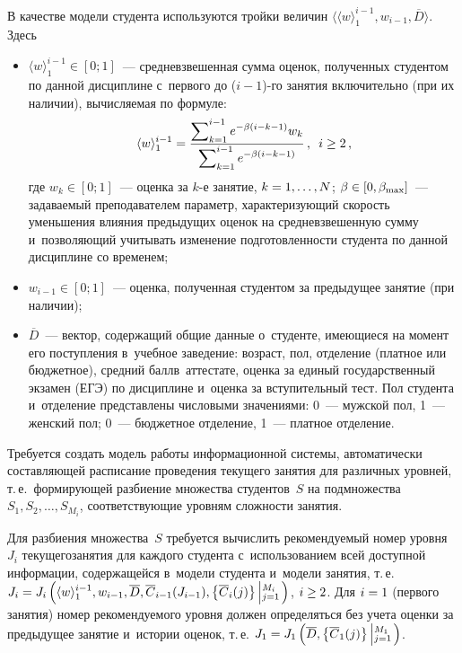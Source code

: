 \begin{multicols}{2}
  В качестве модели студента используются тройки величин $\langle\langle 
w\rangle_1^{i-1}, w_{i-1}, \overline{D}\rangle$. Здесь
  \begin{itemize}
\item $\langle w\rangle_1^{i-1}\in [0;1]$~--- средневзвешенная сумма оценок, 
полученных студентом по данной дис\-циплине с~первого до ($i-1$)-го занятия 
включитель\-но (при их наличии), вычисляемая по формуле:
\begin{equation}
\langle w\rangle_1^{i-1}= \displaystyle\frac{\displaystyle \sum\nolimits_{k=1}^{i-1}  
e^{-\beta(i-k-1)}w_k\mathstrut}{\displaystyle \sum\nolimits_{k=1}^{i-1} e^{-\beta(i-k-1)}\mathstrut}\,, 
\enskip i\geq 2\,,
\label{e1-al}
\end{equation}
  где $w_k\in [0;1]$~--- оценка за $k$-е занятие, $k\hm=1,\ldots, N$; 
$\beta\hm\in [0,\beta_{\max}]$~--- задаваемый преподавателем параметр, 
характеризующий скорость уменьшения влияния предыдущих оценок на 
средневзвешенную сумму и~позволяющий учитывать изменение 
подготовленности студента по данной дисциплине со временем; 
\item $w_{i-1}\in [0;1]$~--- оценка, полученная студентом за предыдущее 
занятие (при наличии); 
\item $\overline{D}$~--- вектор, содержащий общие данные о~студенте, 
имеющиеся на момент его поступления в~учебное заведение: возраст, пол, 
отделение (платное или бюджетное), средний балл\linebreak в~аттестате, оценка за единый
государственный экзамен (ЕГЭ) 
по дисциплине и~оценка за вступительный тест. Пол студента и~отделение 
представлены числовыми значениями: 0~--- мужской пол, 1~--- женский пол; 
0~--- бюджетное отделение, 1~--- платное отделение.
\end{itemize}
  
  Требуется создать модель работы информационной системы, автоматически 
составляющей расписание проведения текущего занятия для различных 
уровней, т.\,е.\ формирующей разбиение множества студентов~$S$ на 
подмножества  $S_1,S_2,\ldots, S_{M_i}$, соответствующие уровням 
сложности занятия.
  
  Для разбиения множества~$S$ требуется вы\-чис\-лить рекомендуемый номер 
уровня~$J_i$ текущего\linebreak занятия для каждого студента с~использованием всей 
доступной информации, содержащейся в~модели студента и~модели занятия, 
т.\,е.\ $J_i\hm= J_i\left( \langle w\rangle_1^{i-1}, w_{i-1}, \overline{D}, 
\overline{C}_{i-1}(J_{i-1}), \left\{ 
\overline{C}_i(j)\right\}\left\vert_{j=1}^{M_i}\right.\right)$, $i\hm\geq 2$. Для $i\hm=1$ 
(первого занятия) номер рекомендуемого уровня должен определяться без 
учета оценки за предыдущее занятие и~истории оценок, т.\,е. $J_1\hm= J_1\left( 
\overline{D}, \left\{ \overline{C}_1(j)\right\} \left\vert_{j=1}^{M_1}\right.\right)$.
  

\end{multicols}
